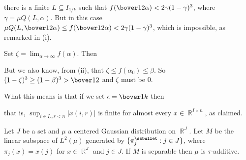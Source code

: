{\noindent there is a finite $L\subseteq I_{1/k}$ such that
$f(\bover12\alpha)<2\gamma(1-\gamma)^3$, where
$\gamma=\mu Q(L,\alpha)$.   But in this case
$\mu Q(L,\bover12\alpha)\le f(\bover12\alpha)<2\gamma(1-\gamma)^3$,
which is impossible, as remarked in (i).\ \Bang\Qed

Set $\zeta=\lim_{\alpha\to\infty}f(\alpha)$.   Then


\noindent But we also know, from (ii), that
$\zeta\le f(\alpha_0)\le\beta$.   So
$(1-\zeta)^3\ge(1-\beta)^3>\bover12$ and $\zeta$ must be $0$.

What this means is that if we set $\epsilon=\bover1k$ then


\noindent that is, $\sup_{i\in I_{\epsilon},r<n}|x(i,r)|$ is finite for
almost every $x\in\BbbR^{I\times n}$, as claimed.
}%

 Let $J$ be a set and $\mu$ a centered Gaussian
distribution on $\BbbR^J$.   Let $M$ be the linear subspace of
$L^2(\mu)$ generated by $\{\pi_j^{\ssbullet}:j\in J\}$, where
$\pi_j(x)=x(j)$ for $x\in\BbbR^J$ and $j\in J$.   If $M$ is
separable then $\mu$ is
$\tau$-additive.

